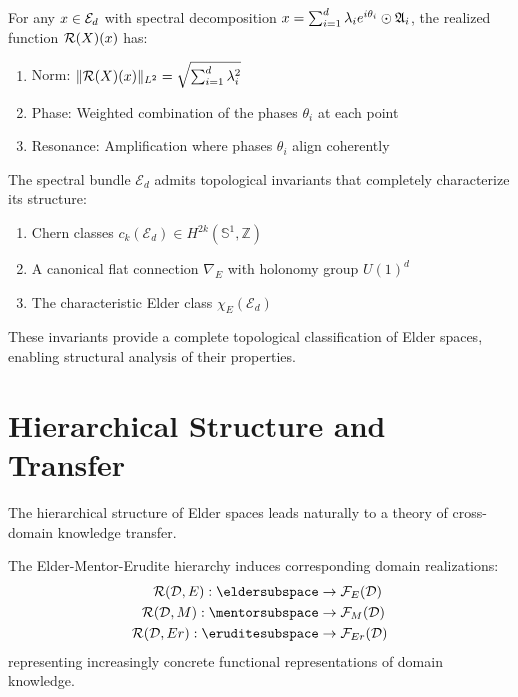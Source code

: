 \begin{lemma}
For any $x \in \mathcal{E}_{d}$ with spectral decomposition $x = \sum_{i=1}^{d} \lambda_i e^{i\theta_i} \odot \mathfrak{A}_{i}$, the realized function $\mathcal{R}(X)(x)$ has:
\begin{enumerate}
    \item Norm: $\|\mathcal{R}(X)(x)\|_{L^2} = \sqrt{\sum_{i=1}^{d} \lambda_i^2}$
    \item Phase: Weighted combination of the phases $\theta_i$ at each point
    \item Resonance: Amplification where phases $\theta_i$ align coherently
\end{enumerate}
\end{lemma}

\begin{theorem}
The spectral bundle $\mathcal{E}_d$ admits topological invariants that completely characterize its structure:
\begin{enumerate}
    \item Chern classes $c_k(\mathcal{E}_d) \in H^{2k}(\mathbb{S}^1, \mathbb{Z})$
    \item A canonical flat connection $\nabla_E$ with holonomy group $U(1)^d$
    \item The characteristic Elder class $\chi_E(\mathcal{E}_d)$
\end{enumerate}
\end{theorem}

These invariants provide a complete topological classification of Elder spaces, enabling structural analysis of their properties.

\section{Hierarchical Structure and Transfer}

The hierarchical structure of Elder spaces leads naturally to a theory of cross-domain knowledge transfer.

\begin{theorem}
The Elder-Mentor-Erudite hierarchy induces corresponding domain realizations:
\begin{align}
\realization{\mathcal{D},E}: \eldersubspace &\rightarrow \mathcal{F}_E(\mathcal{D}) \\
\realization{\mathcal{D},M}: \mentorsubspace &\rightarrow \mathcal{F}_M(\mathcal{D}) \\
\realization{\mathcal{D},Er}: \eruditesubspace &\rightarrow \mathcal{F}_{Er}(\mathcal{D})
\end{align}
representing increasingly concrete functional representations of domain knowledge.
\end{theorem}

